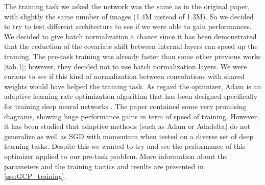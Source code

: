The training task we asked the network was the same as in the original paper, with slightly the same number of images (1.4M instead of 1.3M). So we decided to try to test different architecture to see if we were able to gain performances.\newline
We decided to give batch normalization a chance since it has been demonstrated \cite{batch_norm_paper} that the reduction of the covariate shift between internal layers can speed up the training. The pre-task training was already faster than some other previous works \cite{Noroozi_2016}[tab.1]; however, they decided not to use batch normalization layers. We were curious to see if this kind of normalization between convolutions with shared weights would have helped the training task. \newline
As regard the optimizer, Adam is an adaptive learning rate optimization algorithm that has been designed specifically for training deep neural networks \cite{adam_trend}. The paper contained some very promising diagrams, showing huge performance gains in term of speed of training. However, it has been studied that adaptive methods (such as Adam or Adadelta) do not generalize as well as SGD with momentum \cite{adam_generalization} when tested on a diverse set of deep learning tasks. Despite this we wanted to try and see the performance of this optimizer applied to our pre-task problem. More information about the parameters and the training tactics and results are presented in \ref{sss:GCP_training}.
